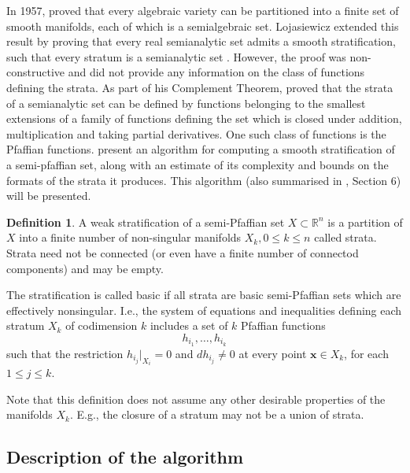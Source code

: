 \documentclass[
]{book}
\theoremstyle{definition}
\newtheorem{definition}{Definition}[chapter]
\theoremstyle{definition}
\theoremstyle{definition}
\theoremstyle{definition}
\theoremstyle{remark}
\begin{document}
In 1957, \citet{whitney1992} proved that every algebraic variety can be partitioned into a finite set of smooth manifolds, each of which is a semialgebraic set.
Lojasiewicz extended this result by proving that every real semianalytic set admits a smooth stratification, such that every stratum is a semianalytic set \citep{lojasiewicz1964}. However, the proof was non-constructive and did not provide any information on the class of functions defining the strata.
As part of his Complement Theorem, \citet{gabrielov1996} proved that the strata of a semianalytic set can be defined by functions belonging to the smallest extensions of a family of functions defining the set which is closed under addition, multiplication and taking partial derivatives. One such class of functions is the Pfaffian functions.
\citet{gv1995} present an algorithm for computing a smooth stratification of a semi-pfaffian set, along with an estimate of its complexity and bounds on the formats of the strata it produces. This algorithm (also summarised in \citet{gv04}, Section 6) will be presented.

\begin{definition}
\citep[Definition 6.2]{gv04}
A weak stratification of a semi-Pfaffian set \(X \subset \mathbb{R}^n\) is a partition of \(X\) into a finite number of non-singular manifolds \(X_k, 0 \le k \le n\) called strata. Strata need not be connected (or even have a finite number of connectod components) and may be empty.

The stratification is called basic if all strata are basic semi-Pfaffian sets which are effectively nonsingular.
I.e., the system of equations and inequalities defining each stratum \(X_k\) of codimension \(k\) includes a set of \(k\) Pfaffian functions
\[
h_{i_1}, \ldots , h_{i_k}
\] such that the restriction \(h_{i_j}\vert_{X_i} = 0\) and \(d h_{i_j} \ne 0\) at every point \(\mathbf{x} \in X_k\), for each \(1 \le j \le k\).
\end{definition}

Note that this definition does not assume any other desirable properties of the manifolds \(X_k\). E.g., the closure of a stratum may not be a union of strata.

\hypertarget{sec:strat-alg-description}{%
\subsection{Description of the algorithm}\label{sec:strat-alg-description}}
\end{document}
